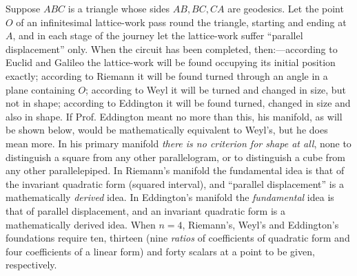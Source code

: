 \documentclass[11pt]{article}
\begin{document}
\indent Suppose $ABC$ is a triangle whose sides $AB,BC,CA$ are geodesics. Let the point $O$ of an infinitesimal lattice-work pass round the triangle, starting and ending at $A$, and in each stage of the journey let the lattice-work suffer ``parallel displacement'' only. When the circuit has been completed, then:---according to Euclid and Galileo the lattice-work will be found occupying its initial position exactly; according to Riemann it will be found turned through an angle in a plane containing $O$; according to Weyl it will
be turned and changed in size, but not in shape; according to Eddington it will be found turned, changed in size and also in shape. If Prof. Eddington meant no more than this, his manifold, as will be shown below, would be mathematically equivalent to Weyl's, but he does mean more. In his primary manifold \emph{there is no criterion for shape at all}, none to distinguish a square from any other parallelogram, or to distinguish a cube from any other parallelepiped. In Riemann's manifold the fundamental idea is that of the invariant quadratic form (squared interval), and ``parallel displacement'' is a mathematically \emph{derived} idea. In Eddington's manifold the \emph{fundamental} idea is that of parallel displacement, and an invariant quadratic form is a mathematically derived idea. When $n=4$, Riemann's, Weyl's and Eddington's foundations require ten, thirteen (nine \emph{ratios} of coefficients of quadratic form and four coefficients of a linear form) and forty scalars at a point to be given, respectively.
\end{document}
